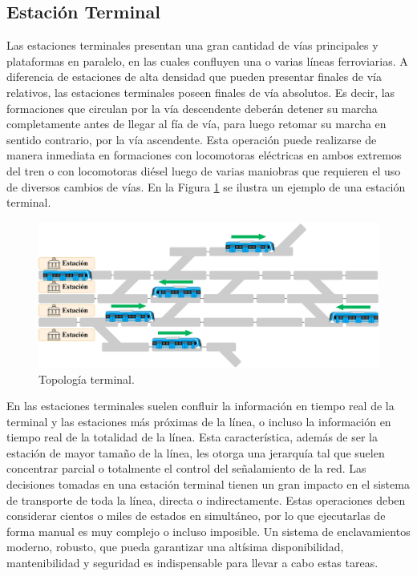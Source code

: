 \subsection{Estación Terminal}

Las estaciones terminales presentan una gran cantidad de vías principales y plataformas en paralelo, en las cuales confluyen una o varias líneas ferroviarias. A diferencia de estaciones de alta densidad que pueden presentar finales de vía relativos, las estaciones terminales poseen finales de vía absolutos. Es decir, las formaciones que circulan por la vía descendente deberán detener su marcha completamente antes de llegar al fía de vía, para luego retomar su marcha en sentido contrario, por la vía ascendente. Esta operación puede realizarse de manera inmediata en formaciones con locomotoras eléctricas en ambos extremos del tren o con locomotoras diésel luego de varias maniobras que requieren el uso de diversos cambios de vías. En la Figura \ref{fig:terminal_1} se ilustra un ejemplo de una estación terminal.

    \begin{figure}[H]
        \centering
        \includegraphics[width=1\textwidth]{Figuras/terminal}
        \centering\caption{Topología terminal.}
        \label{fig:terminal_1}
    \end{figure}

En las estaciones terminales suelen confluir la información en tiempo real de la terminal y las estaciones más próximas de la línea, o incluso la información en tiempo real de la totalidad de la línea. Esta característica, además de ser la estación de mayor tamaño de la línea, les otorga una jerarquía tal que suelen concentrar parcial o totalmente el control del señalamiento de la red. Las decisiones tomadas en una estación terminal tienen un gran impacto en el sistema de transporte de toda la línea, directa o indirectamente. Estas operaciones deben considerar cientos o miles de estados en simultáneo, por lo que ejecutarlas de forma manual es muy complejo o incluso imposible. Un sistema de enclavamientos moderno, robusto, que pueda garantizar una altísima disponibilidad, mantenibilidad y seguridad es indispensable para llevar a cabo estas tareas.